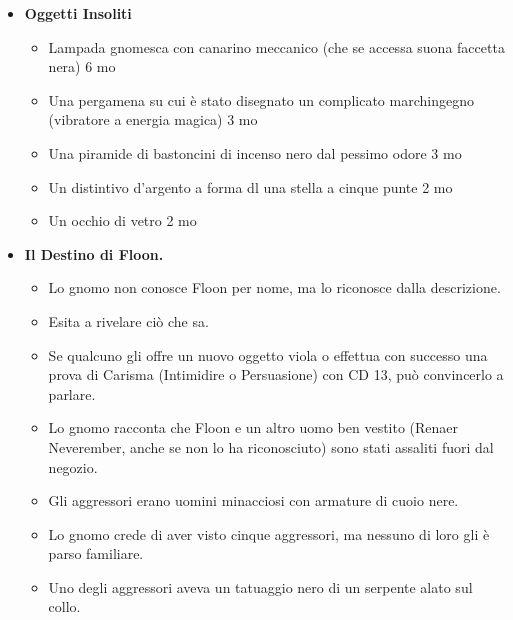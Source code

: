 \documentclass{article}
\begin{document}
                        \begin{itemize}
                        

                            \item \textbf{Oggetti Insoliti} 
                        \begin{itemize}
                                \item Lampada gnomesca con canarino meccanico (che se accessa suona faccetta nera) 6 mo 
                                \item Una pergamena su cui è stato disegnato un complicato
                                marchingegno (vibratore a energia magica) 3 mo
                                \item Una piramide di bastoncini di incenso nero dal pessimo
                                odore 3 mo
                                \item Un distintivo d'argento a forma dl una stella a cinque
                                punte 2 mo
                                \item Un occhio di vetro 2 mo
                            \end{itemize}
                        \item \textbf{Il Destino di Floon.}
                        \begin{itemize}
                            \item Lo gnomo non conosce Floon per nome, ma lo riconosce dalla descrizione.
                            \item Esita a rivelare ciò che sa.
                            \item Se qualcuno gli offre un nuovo oggetto viola o effettua con successo una prova di Carisma (Intimidire o Persuasione) con CD 13, può convincerlo a parlare.
                            \item Lo gnomo racconta che Floon e un altro uomo ben vestito (Renaer Neverember, anche se non lo ha riconosciuto) sono stati assaliti fuori dal negozio.
                            \item Gli aggressori erano uomini minacciosi con armature di cuoio nere.
                            \item Lo gnomo crede di aver visto cinque aggressori, ma nessuno di loro gli è parso familiare.
                            \item Uno degli aggressori aveva un tatuaggio nero di un serpente alato sul collo.
                        \end{itemize}
                        
                        \end{itemize}
\end{document}
